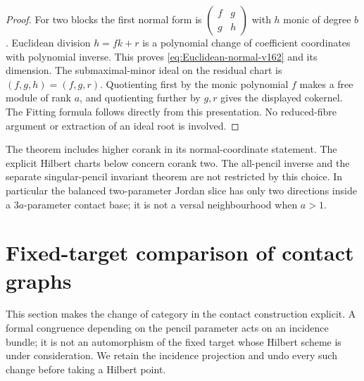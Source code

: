 \documentclass[11pt,reqno]{amsart}
\numberwithin{equation}{section}
\theoremstyle{definition}\newtheorem{definition}[theorem]{Definition}
\theoremstyle{remark}\newtheorem{remark}[theorem]{Remark}
\begin{document}
\begin{proof}
For two blocks the first normal form is
$\left(\begin{smallmatrix}f&g\\g&h\end{smallmatrix}\right)$ with
$h$ monic of degree $b$. Euclidean division $h=fk+r$ is a polynomial
change of coefficient coordinates with polynomial inverse. This
proves \eqref{eq:Euclidean-normal-v162} and its dimension. The
submaximal-minor ideal on the residual chart is $(f,g,h)=(f,g,r)$.
Quotienting first by the monic polynomial $f$ makes a free module
of rank $a$, and quotienting further by $g,r$ gives the displayed
cokernel. The Fitting formula follows directly from this presentation.
No reduced-fibre argument or extraction of an ideal root is involved.
\end{proof}

The theorem includes higher corank in its normal-coordinate statement.
The explicit Hilbert charts below concern corank two. The all-pencil
inverse and the separate singular-pencil invariant theorem are not
restricted by this choice. In particular the balanced two-parameter
Jordan slice has only two directions inside a $3a$-parameter contact
base; it is not a versal neighbourhood when $a>1$.


\section{Fixed-target comparison of contact graphs}
\label{sec:embedded-comparison-v163}
This section makes the change of category in the contact construction
explicit. A formal congruence depending on the pencil parameter acts
on an incidence bundle; it is not an automorphism of the fixed target
whose Hilbert scheme is under consideration. We retain the incidence
projection and undo every such change before taking a Hilbert point.
\end{document}
